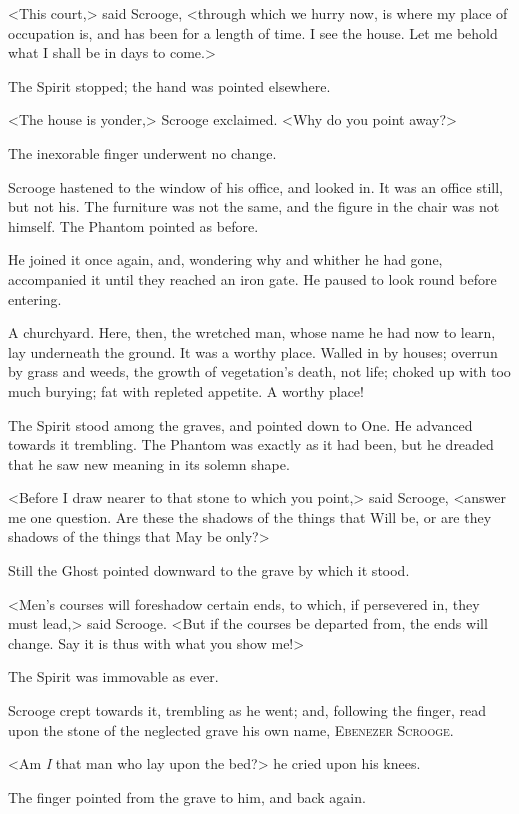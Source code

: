 <This court,> said Scrooge, <through which we hurry now, is where my place of occupation is, and has been for a length of time. I see the house. Let me behold what I shall be in days to come.>

The Spirit stopped; the hand was pointed elsewhere.

<The house is yonder,> Scrooge exclaimed. <Why do you point away?>

The inexorable finger underwent no change.

Scrooge hastened to the window of his office, and looked in. It was an office still, but not his. The furniture was not the same, and the figure in the chair was not himself. The Phantom pointed as before.

He joined it once again, and, wondering why and whither he had gone, accompanied it until they reached an iron gate. He paused to look round before entering.

A churchyard. Here, then, the wretched man, whose name he had now to learn, lay underneath the ground. It was a worthy place. Walled in by houses; overrun by grass and weeds, the growth of vegetation's death, not life; choked up with too much burying; fat with repleted appetite. A worthy place!

The Spirit stood among the graves, and pointed down to One. He advanced towards it trembling. The Phantom was exactly as it had been, but he dreaded that he saw new meaning in its solemn shape.

<Before I draw nearer to that stone to which you point,> said Scrooge, <answer me one question. Are these the shadows of the things that Will be, or are they shadows of the things that May be only?>

Still the Ghost pointed downward to the grave by which it stood.

<Men's courses will foreshadow certain ends, to which, if persevered in, they must lead,> said Scrooge. <But if the courses be departed from, the ends will change. Say it is thus with what you show me!>

The Spirit was immovable as ever.

Scrooge crept towards it, trembling as he went; and, following the finger, read upon the stone of the neglected grave his own name, \textsc{Ebenezer Scrooge}.

<Am \textit{I} that man who lay upon the bed?> he cried upon his knees.

The finger pointed from the grave to him, and back again.

